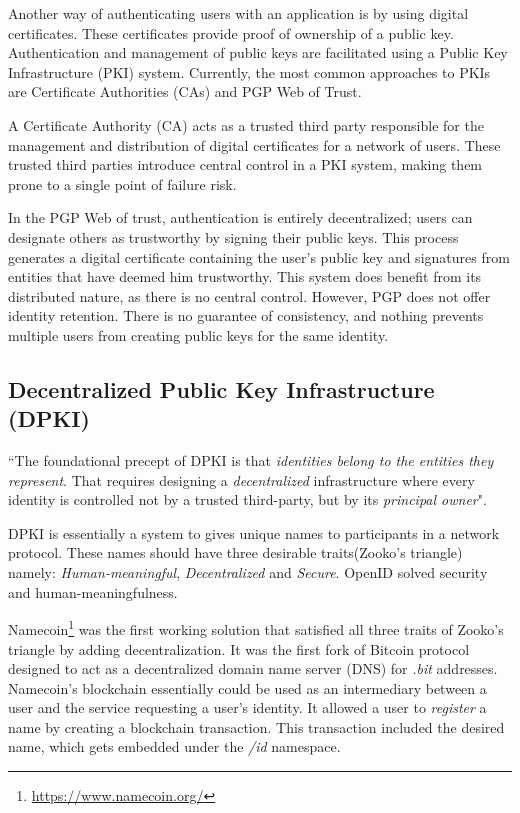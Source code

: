 	Another way of authenticating users with an application is by using digital certificates\cite{tycksen2001digital}. These certificates provide proof of ownership of a public key. Authentication and management of public keys are facilitated using a Public Key Infrastructure (PKI)\cite{adams2003understanding} system. Currently, the most common approaches to PKIs are Certificate Authorities (CAs) and PGP Web of Trust\cite{abdul1997pgp}. 
	
	A Certificate Authority (CA) acts as a trusted third party responsible for the management and distribution of digital certificates for a network of users\cite{fromknecht2014decentralized}. These trusted third parties introduce central control in a PKI system, making them prone to a single point of failure risk\cite{dooley2001designing}.
	
	In the PGP Web of trust, authentication is entirely decentralized; users can designate others as trustworthy by signing their public keys. This process generates a digital certificate containing the user's public key and signatures from entities that have deemed him trustworthy. This system does benefit from its distributed nature, as there is no central control. However, PGP does not offer identity retention. There is no guarantee of consistency, and nothing prevents multiple users from creating public keys for the same identity\cite{fromknecht2014decentralized}.
	
	\subsection{Decentralized Public Key Infrastructure (DPKI)}
		``The foundational precept of DPKI is that \textit{identities belong to the entities they represent}. That requires designing a \textit{decentralized} infrastructure where every identity is controlled not by a trusted third-party, but by its \textit{principal owner}"\cite{allen2015decentralized}.
		
		DPKI is essentially a system to gives unique names to participants in a network protocol. These names should have three desirable traits(Zooko's triangle) namely: \textit{Human-meaningful}, \textit{Decentralized} and \textit{Secure}. OpenID solved security and human-meaningfulness.
		
		Namecoin\footnote{\url{https://www.namecoin.org/}} was the first working solution that satisfied all three traits of Zooko's triangle by adding decentralization. It was the first fork of Bitcoin\cite{nakamoto2008bitcoin} protocol designed to act as a decentralized domain name server (DNS) for \textit{.bit} addresses. Namecoin's blockchain essentially could be used as an intermediary between a user and the service requesting a user's identity\cite{raval2016decentralized}. It allowed a user to \textit{register} a name by creating a blockchain transaction. This transaction included the desired name, which gets embedded under the \textit{/id} namespace.
		
